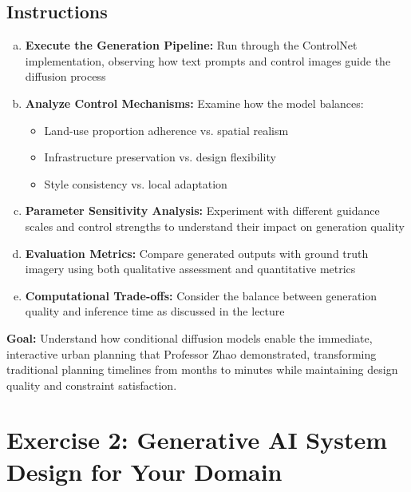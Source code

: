 \documentclass[11pt]{article}
\begin{document}
\subsection*{Instructions}
\begin{enumerate}[(a)]
\item \textbf{Execute the Generation Pipeline:} Run through the ControlNet implementation, observing how text prompts and control images guide the diffusion process
\item \textbf{Analyze Control Mechanisms:} Examine how the model balances:
\begin{itemize}
\item Land-use proportion adherence vs. spatial realism
\item Infrastructure preservation vs. design flexibility
\item Style consistency vs. local adaptation
\end{itemize}
\item \textbf{Parameter Sensitivity Analysis:} Experiment with different guidance scales and control strengths to understand their impact on generation quality
\item \textbf{Evaluation Metrics:} Compare generated outputs with ground truth imagery using both qualitative assessment and quantitative metrics
\item \textbf{Computational Trade-offs:} Consider the balance between generation quality and inference time as discussed in the lecture
\end{enumerate}

\noindent\textbf{Goal:} Understand how conditional diffusion models enable the immediate, interactive urban planning that Professor Zhao demonstrated, transforming traditional planning timelines from months to minutes while maintaining design quality and constraint satisfaction.

\section*{Exercise 2: Generative AI System Design for Your Domain}

\begin{center}
\end{center}
\end{document}
